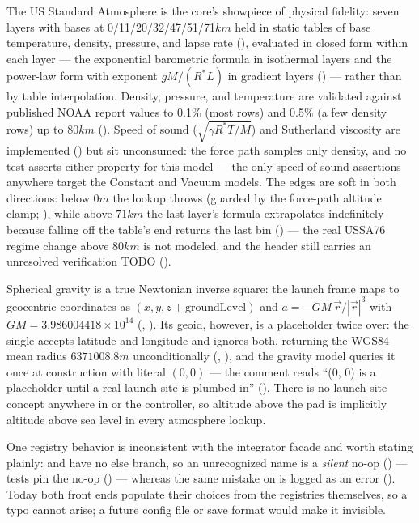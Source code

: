 The US Standard Atmosphere is the core's showpiece of physical fidelity: seven layers with bases
at 0/11/20/32/47/51/71$\unit{km}$ held in static  tables of base temperature,
density, pressure, and lapse rate (), evaluated in closed
form within each layer --- the exponential barometric formula in isothermal layers and the
power-law form with exponent $gM/(R^{*}L)$ in gradient layers
() --- rather than by table interpolation. Density,
pressure, and temperature are validated against published NOAA report values to 0.1\% (most rows)
and 0.5\% (a few density rows) up to $80\unit{km}$ ().
Speed of sound ($\sqrt{\gamma R^{*}T/M}$) and Sutherland viscosity are implemented
() but sit unconsumed: the force path samples only density,
and no test asserts either property for this model --- the only speed-of-sound assertions anywhere
target the Constant and Vacuum models. The edges are soft in both directions: below $0\unit{m}$
the  lookup throws (guarded by the force-path altitude clamp;
), while above $71\unit{km}$ the last layer's formula extrapolates
indefinitely because falling off the table's end returns the last bin
() --- the real USSA76 regime change above $80\unit{km}$ is not modeled,
and the header still carries an unresolved verification TODO
().

Spherical gravity is a true Newtonian inverse square: the launch frame maps to geocentric
coordinates as $(x, y, z + \text{groundLevel})$ and $a = -GM\,\vec{r}/|\vec{r}|^{3}$ with
$GM=3.986004418\times10^{14}$ (,
). Its geoid, however, is a placeholder twice over: the single
 accepts latitude and longitude and ignores both, returning the WGS84
mean radius $6371008.8\unit{m}$ unconditionally (,
), and the gravity model queries it once at construction with
literal $(0,0)$ --- the comment reads ``(0, 0) is a placeholder until a real launch site is
plumbed in'' (). There is no launch-site concept anywhere
in  or the controller, so altitude above the pad is implicitly altitude above
sea level in every atmosphere lookup.

One registry behavior is inconsistent with the integrator facade and worth stating plainly:
 and  have no else branch, so an unrecognized name
is a \emph{silent} no-op () --- tests pin the no-op
() --- whereas the same mistake on
 is logged as an error (). Today both front ends
populate their choices from the registries themselves, so a typo cannot arise; a future config
file or save format would make it invisible.

